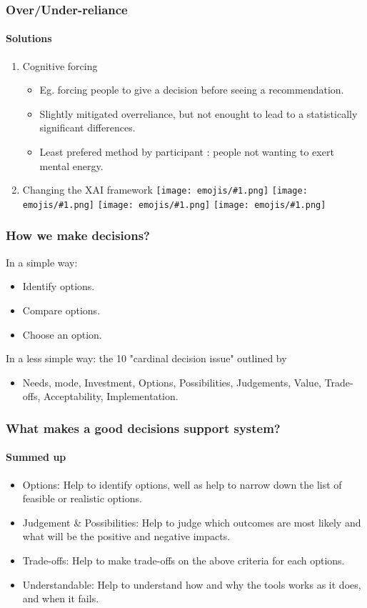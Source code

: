 \documentclass[compress,12pt]{beamer}
\newcommand{\emoji}[1]{\texttt{[image: emojis/\#1.png]}}
\begin{document}
\begin{frame}
      \frametitle{Over/Under-reliance}
      \framesubtitle{Solutions}
      \begin{enumerate}
            \item Cognitive forcing \begin{itemize}
                  \item Eg. forcing people to give a decision before seeing a recommendation.
                  \item Slightly mitigated overreliance, but not enought to lead to a statistically significant differences.
                  \item Least prefered method by participant : people not wanting to exert mental energy.
            \end{itemize}
            \item Changing the XAI framework \emoji{smirking-face} \emoji{thinking-face} \emoji{thought-balloon} \emoji{light-bulb}
      \end{enumerate}
\end{frame}

\begin{frame}
      \frametitle{How we make decisions?}
      In a simple way: 
      \begin{itemize}
            \item Identify options.
            \item Compare options.
            \item Choose an option.
      \end{itemize}
      In a less simple way: the 10 "cardinal decision issue" outlined by \cite{evidence-based-decision-management} \begin{itemize}
            \item Needs, mode, Investment, Options, Possibilities, Judgements, Value, Trade-offs, Acceptability, Implementation.
      \end{itemize}
\end{frame}

\begin{frame}
      \frametitle{What makes a good decisions support system?}
      \framesubtitle{Summed up}
      \begin{itemize}
            \item Options: Help to identify options, well as help to narrow down the list of feasible or realistic options.
            \item Judgement \& Possibilities: Help to judge which outcomes are most likely and what will be the positive and negative impacts.
            \item Trade-offs: Help to make trade-offs on the above criteria for each options.
            \item Understandable: Help to understand how and why the tools works as it does, and when it fails.
      \end{itemize}
\end{frame}
\end{document}
